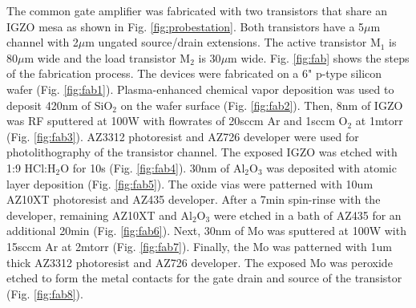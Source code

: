 \documentclass[conference]{IEEEtran}
\begin{document}
The common gate amplifier was fabricated with two transistors that share an IGZO mesa as shown in Fig. \ref{fig:probestation}.
Both transistors have a 5$\mu$m channel with 2$\mu$m ungated source/drain extensions.
The active transistor M$_1$ is 80$\mu$m wide and the load transistor M$_2$ is 30$\mu$m wide.
Fig. \ref{fig:fab} shows the steps of the fabrication process.
The devices were fabricated on a 6" p-type silicon wafer (Fig. \ref{fig:fab1}).
Plasma-enhanced chemical vapor deposition was used to deposit 420nm of SiO$_2$ on the wafer surface (Fig. \ref{fig:fab2}).
Then, 8nm of IGZO was RF sputtered at 100W with flowrates of 20sccm Ar and 1sccm O$_2$ at 1mtorr (Fig. \ref{fig:fab3}).
AZ3312 photoresist and AZ726 developer were used for photolithography of the transistor channel.
The exposed IGZO was etched with 1:9 HCl:H$_2$O for 10s (Fig. \ref{fig:fab4}).
30nm of Al$_2$O$_3$ was deposited with atomic layer deposition (Fig. \ref{fig:fab5}).
The oxide vias were patterned with 10um AZ10XT photoresist and AZ435 developer.
After a 7min spin-rinse with the developer, remaining AZ10XT and Al$_2$O$_3$ were etched in a bath of AZ435 for an additional 20min (Fig. \ref{fig:fab6}).
Next, 30nm of Mo was sputtered at 100W with 15sccm Ar at 2mtorr (Fig. \ref{fig:fab7}).
Finally, the Mo was patterned with 1um thick AZ3312 photoresist and AZ726 developer.
The exposed Mo was peroxide etched to form the metal contacts for the gate drain and source of the transistor (Fig. \ref{fig:fab8}).
\end{document}
